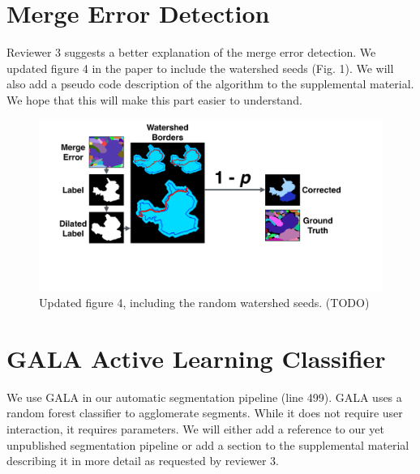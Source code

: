 \documentclass[10pt,twocolumn,letterpaper]{article}
\begin{document}
\section{Merge Error Detection}

Reviewer 3 suggests a better explanation of the merge error detection. We updated figure 4 in the paper to include the watershed seeds (Fig. 1). We will also add a pseudo code description of the algorithm to the supplemental material. We hope that this will make this part easier to understand.

\begin{figure}[h]
\centering
\includegraphics[width=\linewidth]{gfx/merge_error_v4.pdf}
\caption{Updated figure 4, including the random watershed seeds. (TODO)}
\label{fig:merge_error}
\end{figure}


\section{GALA Active Learning Classifier}

We use GALA in our automatic segmentation pipeline (line 499). GALA uses a random forest classifier to agglomerate segments. While it does not require user interaction, it requires parameters. We will either add a reference to our yet unpublished segmentation pipeline or add a section to the supplemental material describing it in more detail as requested by reviewer 3.

%
%
\end{document}
